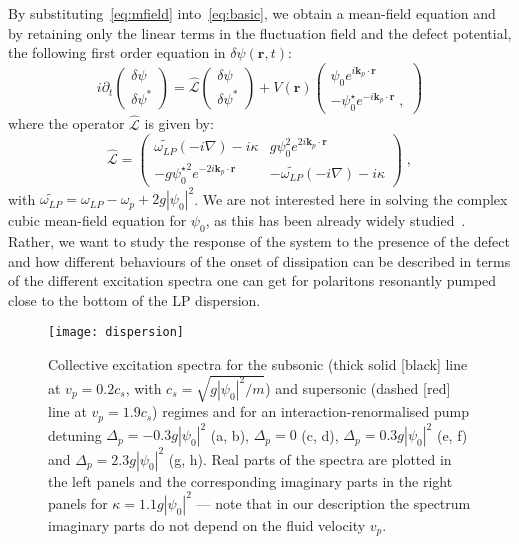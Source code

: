 By substituting~\eqref{eq:mfield} into~\eqref{eq:basic}, we obtain a
mean-field equation and by retaining only the linear terms in the
fluctuation field and the defect potential, the following first order
equation in $\delta \psi (\bm{r},t)$:
%
\begin{equation}
  i \partial_t \begin{pmatrix} \delta \psi \\ \delta
    \psi^* \end{pmatrix} = \hat{\mathcal{L}} \begin{pmatrix} \delta
    \psi \\ \delta \psi^* \end{pmatrix} + V(\bm{r}) \begin{pmatrix}
    \psi_0 e^{i \bm{k}_p \cdot \bm{r}} \\ -\psi_0^{\star} e^{-i
      \bm{k}_p \cdot \bm{r}}\; ,
    \end{pmatrix}
\label{eq:linre}
\end{equation}
%
where the operator $\hat{\mathcal{L}}$ is given by:
%
\begin{equation}
 \hat{\mathcal{L}} = \begin{pmatrix} \widetilde{\omega_{LP}}
   (-i\nabla) - i \kappa & g \psi_0^2 e^{2 i \bm{k}_p \cdot
     \bm{r}} \\ -g {\psi_0^{\star}}^2 e^{-2 i \bm{k}_p \cdot
     \bm{r}}& - \widetilde{\omega_{LP}}(-i \nabla) -
   i\kappa \end{pmatrix}\; ,
\end{equation}
%
with $\widetilde{\omega_{LP}} = \omega_{LP}-\omega_p + 2g
|\psi_0|^2$. We are not interested here in solving the complex cubic
mean-field equation for $\psi_0$, as this has been already widely
studied~\cite{9780199228942}. Rather, we want to study the response
of the system to the presence of the defect and how different
behaviours of the onset of dissipation can be described in terms of
the different excitation spectra one can get for polaritons resonantly
pumped close to the bottom of the LP dispersion.

\begin{figure}[tb]\centering
\texttt{[image: dispersion]} %
\caption{
%
Collective excitation spectra for the subsonic (thick
solid [black] line at $v_p=0.2 c_s$, with $c_s=\sqrt{g|\psi_0|^2/m}$)
and supersonic (dashed [red] line at $v_p=1.9 c_s$) regimes and for an
interaction-renormalised pump detuning $\Delta_p=-0.3 g|\psi_0|^2$ (a,
b), $\Delta_p = 0$ (c, d), $\Delta_p=0.3g|\psi_0|^2$ (e, f) and
$\Delta_p=2.3g|\psi_0|^2$ (g, h). Real parts of the spectra are
plotted in the left panels and the corresponding imaginary parts in
the right panels for $\kappa=1.1 g|\psi_0|^2$ --- note that in our
description the spectrum imaginary parts do not depend on the fluid
velocity $v_p$.
%
}\label{fig:spect_pmp_only}
\end{figure}
%

